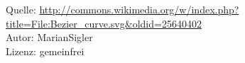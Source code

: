 
\renewcommand{\bibname}{Bildnachweis}
\begin{thebibliography}{[99]}
    Quelle: \url{http://commons.wikimedia.org/w/index.php?title=File:Bezier_curve.svg&oldid=25640402}\\
    Autor: MarianSigler\\
    Lizenz: gemeinfrei
\end{thebibliography}